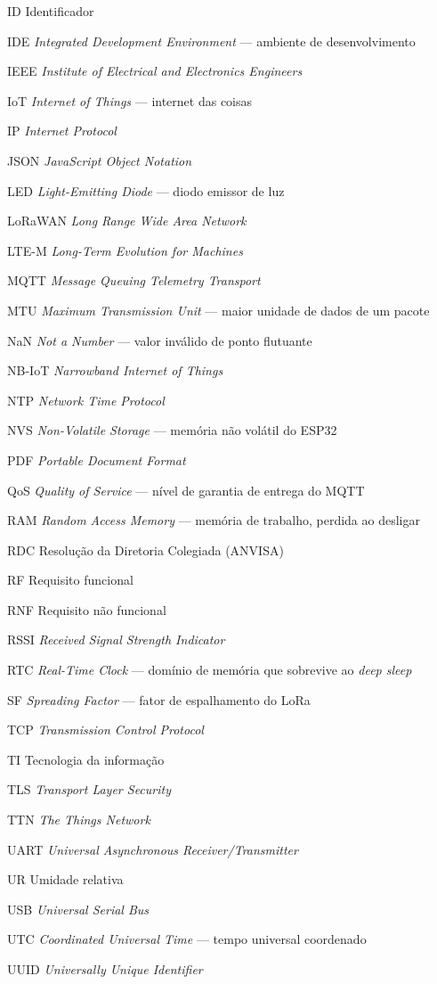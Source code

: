 \begin{siglas}
  \item[ID] Identificador
  \item[IDE] \emph{Integrated Development Environment} --- ambiente de desenvolvimento
  \item[IEEE] \emph{Institute of Electrical and Electronics Engineers}
  \item[IoT] \emph{Internet of Things} --- internet das coisas
  \item[IP] \emph{Internet Protocol}
  \item[JSON] \emph{JavaScript Object Notation}
  \item[LED] \emph{Light-Emitting Diode} --- diodo emissor de luz
  \item[LoRaWAN] \emph{Long Range Wide Area Network}
  \item[LTE-M] \emph{Long-Term Evolution for Machines}
  \item[MQTT] \emph{Message Queuing Telemetry Transport}
  \item[MTU] \emph{Maximum Transmission Unit} --- maior unidade de dados de um pacote
  \item[NaN] \emph{Not a Number} --- valor inválido de ponto flutuante
  \item[NB-IoT] \emph{Narrowband Internet of Things}
  \item[NTP] \emph{Network Time Protocol}
  \item[NVS] \emph{Non-Volatile Storage} --- memória não volátil do ESP32
  \item[PDF] \emph{Portable Document Format}
  \item[QoS] \emph{Quality of Service} --- nível de garantia de entrega do MQTT
  \item[RAM] \emph{Random Access Memory} --- memória de trabalho, perdida ao desligar
  \item[RDC] Resolução da Diretoria Colegiada (ANVISA)
  \item[RF] Requisito funcional
  \item[RNF] Requisito não funcional
  \item[RSSI] \emph{Received Signal Strength Indicator}
  \item[RTC] \emph{Real-Time Clock} --- domínio de memória que sobrevive ao \emph{deep sleep}
  \item[SF] \emph{Spreading Factor} --- fator de espalhamento do LoRa
  \item[TCP] \emph{Transmission Control Protocol}
  \item[TI] Tecnologia da informação
  \item[TLS] \emph{Transport Layer Security}
  \item[TTN] \emph{The Things Network}
  \item[UART] \emph{Universal Asynchronous Receiver/Transmitter}
  \item[UR] Umidade relativa
  \item[USB] \emph{Universal Serial Bus}
  \item[UTC] \emph{Coordinated Universal Time} --- tempo universal coordenado
  \item[UUID] \emph{Universally Unique Identifier}
\end{siglas}
